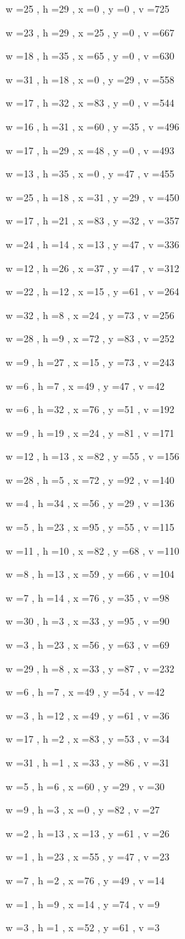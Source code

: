 \documentclass[11pt]{article}
\begin{document}
w =25 , h =29 , x =0 , y =0 , v =725
\par
w =23 , h =29 , x =25 , y =0 , v =667
\par
w =18 , h =35 , x =65 , y =0 , v =630
\par
w =31 , h =18 , x =0 , y =29 , v =558
\par
w =17 , h =32 , x =83 , y =0 , v =544
\par
w =16 , h =31 , x =60 , y =35 , v =496
\par
w =17 , h =29 , x =48 , y =0 , v =493
\par
w =13 , h =35 , x =0 , y =47 , v =455
\par
w =25 , h =18 , x =31 , y =29 , v =450
\par
w =17 , h =21 , x =83 , y =32 , v =357
\par
w =24 , h =14 , x =13 , y =47 , v =336
\par
w =12 , h =26 , x =37 , y =47 , v =312
\par
w =22 , h =12 , x =15 , y =61 , v =264
\par
w =32 , h =8 , x =24 , y =73 , v =256
\par
w =28 , h =9 , x =72 , y =83 , v =252
\par
w =9 , h =27 , x =15 , y =73 , v =243
\par
w =6 , h =7 , x =49 , y =47 , v =42
\par
w =6 , h =32 , x =76 , y =51 , v =192
\par
w =9 , h =19 , x =24 , y =81 , v =171
\par
w =12 , h =13 , x =82 , y =55 , v =156
\par
w =28 , h =5 , x =72 , y =92 , v =140
\par
w =4 , h =34 , x =56 , y =29 , v =136
\par
w =5 , h =23 , x =95 , y =55 , v =115
\par
w =11 , h =10 , x =82 , y =68 , v =110
\par
w =8 , h =13 , x =59 , y =66 , v =104
\par
w =7 , h =14 , x =76 , y =35 , v =98
\par
w =30 , h =3 , x =33 , y =95 , v =90
\par
w =3 , h =23 , x =56 , y =63 , v =69
\par
w =29 , h =8 , x =33 , y =87 , v =232
\par
w =6 , h =7 , x =49 , y =54 , v =42
\par
w =3 , h =12 , x =49 , y =61 , v =36
\par
w =17 , h =2 , x =83 , y =53 , v =34
\par
w =31 , h =1 , x =33 , y =86 , v =31
\par
w =5 , h =6 , x =60 , y =29 , v =30
\par
w =9 , h =3 , x =0 , y =82 , v =27
\par
w =2 , h =13 , x =13 , y =61 , v =26
\par
w =1 , h =23 , x =55 , y =47 , v =23
\par
w =7 , h =2 , x =76 , y =49 , v =14
\par
w =1 , h =9 , x =14 , y =74 , v =9
\par
w =3 , h =1 , x =52 , y =61 , v =3
\par
\newpage
\end{document}
